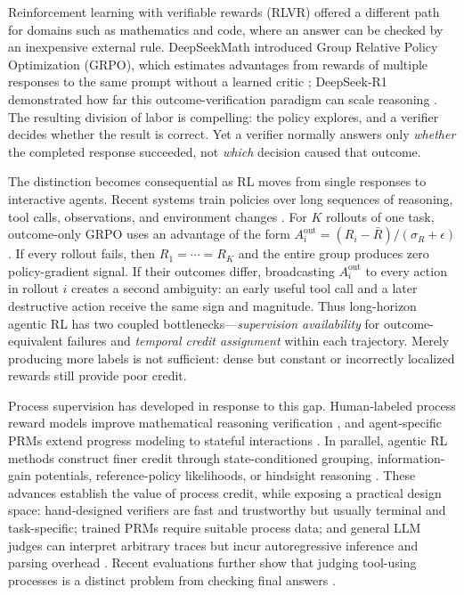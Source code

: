 \documentclass{article}
\begin{document}
Reinforcement learning with verifiable rewards (RLVR) offered a different path for domains such as mathematics and code, where an answer can be checked by an inexpensive external rule. DeepSeekMath introduced Group Relative Policy Optimization (GRPO), which estimates advantages from rewards of multiple responses to the same prompt without a learned critic \citep{shao2024deepseekmath}; DeepSeek-R1 demonstrated how far this outcome-verification paradigm can scale reasoning \citep{guo2025deepseek}. The resulting division of labor is compelling: the policy explores, and a verifier decides whether the result is correct. Yet a verifier normally answers only \emph{whether} the completed response succeeded, not \emph{which} decision caused that outcome.

The distinction becomes consequential as RL moves from single responses to interactive agents. Recent systems train policies over long sequences of reasoning, tool calls, observations, and environment changes \citep{chen2025reinforcement,luo2025agentlightning}. For $K$ rollouts of one task, outcome-only GRPO uses an advantage of the form $A_i^{\mathrm{out}}=(R_i-\bar R)/(\sigma_R+\epsilon)$. If every rollout fails, then $R_1=\cdots=R_K$ and the entire group produces zero policy-gradient signal. If their outcomes differ, broadcasting $A_i^{\mathrm{out}}$ to every action in rollout $i$ creates a second ambiguity: an early useful tool call and a later destructive action receive the same sign and magnitude. Thus long-horizon agentic RL has two coupled bottlenecks---\emph{supervision availability} for outcome-equivalent failures and \emph{temporal credit assignment} within each trajectory. Merely producing more labels is not sufficient: dense but constant or incorrectly localized rewards still provide poor credit.

Process supervision has developed in response to this gap. Human-labeled process reward models improve mathematical reasoning verification \citep{lightman2023verify}, and agent-specific PRMs extend progress modeling to stateful interactions \citep{choudhury2025agentprm,xi2025agentprm}. In parallel, agentic RL methods construct finer credit through state-conditioned grouping, information-gain potentials, reference-policy likelihoods, or hindsight reasoning \citep{feng2025gigpo,wang2026igpo,tao2026trace,xie2026tips,tan2026hindsightcredit}. These advances establish the value of process credit, while exposing a practical design space: hand-designed verifiers are fast and trustworthy but usually terminal and task-specific; trained PRMs require suitable process data; and general LLM judges can interpret arbitrary traces but incur autoregressive inference and parsing overhead \citep{zheng2023judging}. Recent evaluations further show that judging tool-using processes is a distinct problem from checking final answers \citep{li2026toolprmbench,fan2026agentprocessbench}.
\end{document}
